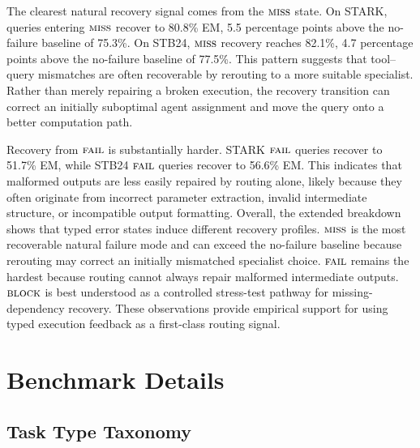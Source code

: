 The clearest natural recovery signal comes from the $\textnormal{\textsc{miss}}$ state.
On STARK, queries entering $\textnormal{\textsc{miss}}$ recover to 80.8\% EM, 5.5 percentage points above the no-failure baseline of 75.3\%.
On STB24, $\textnormal{\textsc{miss}}$ recovery reaches 82.1\%, 4.7 percentage points above the no-failure baseline of 77.5\%.
This pattern suggests that tool--query mismatches are often recoverable by rerouting to a more suitable specialist.
Rather than merely repairing a broken execution, the recovery transition can correct an initially suboptimal agent assignment and move the query onto a better computation path.

Recovery from $\textnormal{\textsc{fail}}$ is substantially harder.
STARK $\textnormal{\textsc{fail}}$ queries recover to 51.7\% EM, while STB24 $\textnormal{\textsc{fail}}$ queries recover to 56.6\% EM.
This indicates that malformed outputs are less easily repaired by routing alone, likely because they often originate from incorrect parameter extraction, invalid intermediate structure, or incompatible output formatting.
Overall, the extended breakdown shows that typed error states induce different recovery profiles.
$\textnormal{\textsc{miss}}$ is the most recoverable natural failure mode and can exceed the no-failure baseline because rerouting may correct an initially mismatched specialist choice.
$\textnormal{\textsc{fail}}$ remains the hardest because routing cannot always repair malformed intermediate outputs.
$\textnormal{\textsc{block}}$ is best understood as a controlled stress-test pathway for missing-dependency recovery.
These observations provide empirical support for using typed execution feedback as a first-class routing signal.

\FloatBarrier
\section{Benchmark Details}
\label{app:benchmarks}

\subsection{Task Type Taxonomy}

